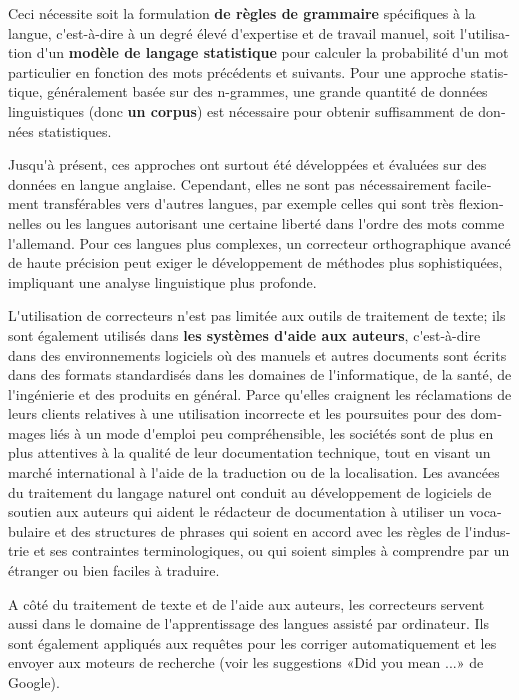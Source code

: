 \begin{french}
\begin{multicols}{2}
Ceci nécessite soit la formulation {\bf de règles
de grammaire} spécifiques à la langue, c{\mbox '}est-à-dire à un degré élevé d{\mbox '}expertise et de travail
manuel, soit l{\mbox '}utilisation d{\mbox '}un {\bf modèle de langage statistique} pour
calculer la probabilité d{\mbox '}un mot particulier en fonction des mots
précédents et suivants. Pour une approche statistique, généralement
basée sur des n-grammes, une grande quantité de données linguistiques
(donc {\bf un corpus}) est nécessaire pour obtenir suffisamment de données
statistiques.

Jusqu{\mbox '}à présent, ces approches ont surtout été développées et évaluées
sur des données en langue anglaise. Cependant, elles ne sont pas
nécessairement facilement transférables vers d{\mbox '}autres langues, par
exemple celles qui sont très flexionnelles ou les langues autorisant
une certaine liberté dans l{\mbox '}ordre des mots comme l{\mbox '}allemand. Pour ces langues
plus complexes, un correcteur orthographique avancé de haute précision
peut exiger le développement de méthodes plus sophistiquées,
impliquant une analyse linguistique plus profonde.

L{\mbox '}utilisation de correcteurs n{\mbox '}est pas limitée aux outils de
traitement de texte; ils sont également utilisés dans {\bf les systèmes
d{\mbox '}aide aux auteurs}, c{\mbox '}est-à-dire dans des environnements logiciels où
des manuels et autres documents sont écrits dans des formats
standardisés dans les domaines de l{\mbox '}informatique, de la santé, de
l{\mbox '}ingénierie et des produits en général. Parce qu{\mbox '}elles craignent les
réclamations de leurs clients relatives à une utilisation incorrecte
et les poursuites pour des dommages liés à un mode d{\mbox '}emploi peu
compréhensible, les sociétés sont de plus en plus attentives à la
qualité de leur documentation technique, tout en visant un marché
international à l{\mbox '}aide de la traduction ou de la localisation. Les
avancées du traitement du langage naturel ont conduit au développement
de logiciels de soutien aux auteurs qui aident le rédacteur de
documentation à utiliser un vocabulaire et des structures de phrases
qui soient en accord avec les règles de l{\mbox '}industrie et ses
contraintes terminologiques, ou qui soient simples à comprendre par un
étranger ou bien faciles à traduire.

A côté du traitement de texte et de l{\mbox '}aide aux auteurs, les
correcteurs servent aussi dans le domaine de l{\mbox '}apprentissage des
langues assisté par ordinateur. Ils sont également appliqués aux
requêtes pour les corriger automatiquement et les envoyer aux moteurs
de recherche (voir les suggestions «Did you mean ...» de
Google).


\end{multicols}
\end{french}
